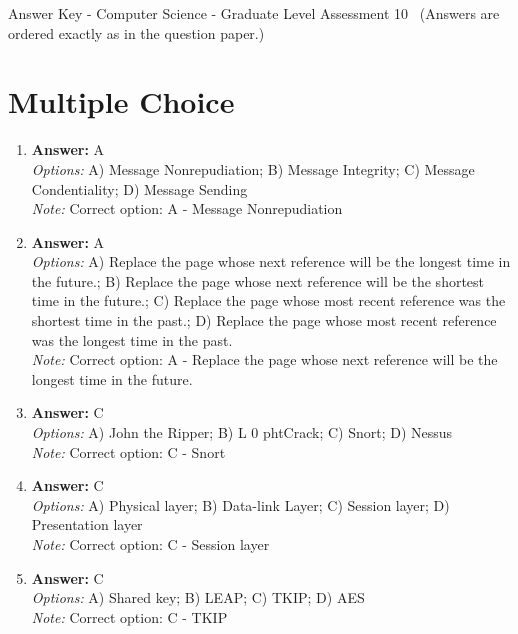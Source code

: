 \documentclass[12pt]{article}
\begin{document}
\begin{center}
Answer Key - Computer Science - Graduate Level Assessment 10 \
\small (Answers are ordered exactly as in the question paper.)
\end{center}

\section*{Multiple Choice}
\begin{enumerate}[label=\arabic*.]
\item \textbf{Answer:} A
\\ \textit{Options:} A) Message Nonrepudiation; B) Message Integrity; C) Message Condentiality; D) Message Sending
\\ \textit{Note:} Correct option: A - Message Nonrepudiation
\item \textbf{Answer:} A
\\ \textit{Options:} A) Replace the page whose next reference will be the longest time in the future.; B) Replace the page whose next reference will be the shortest time in the future.; C) Replace the page whose most recent reference was the shortest time in the past.; D) Replace the page whose most recent reference was the longest time in the past.
\\ \textit{Note:} Correct option: A - Replace the page whose next reference will be the longest time in the future.
\item \textbf{Answer:} C
\\ \textit{Options:} A) John the Ripper; B) L 0 phtCrack; C) Snort; D) Nessus
\\ \textit{Note:} Correct option: C - Snort
\item \textbf{Answer:} C
\\ \textit{Options:} A) Physical layer; B) Data-link Layer; C) Session layer; D) Presentation layer
\\ \textit{Note:} Correct option: C - Session layer
\item \textbf{Answer:} C
\\ \textit{Options:} A) Shared key; B) LEAP; C) TKIP; D) AES
\\ \textit{Note:} Correct option: C - TKIP
\end{enumerate}
\end{document}
